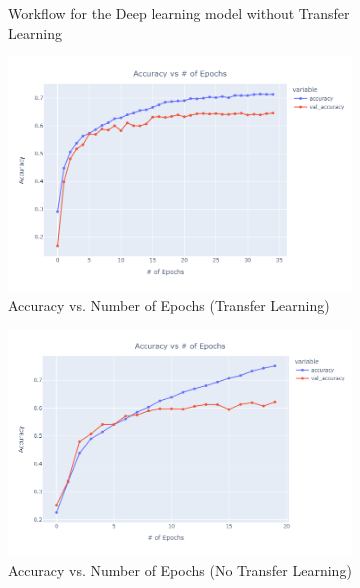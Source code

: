 \documentclass[conference]{IEEEtran}
\begin{document}
\begin{figure}[htbp]
\begin{subfigure}{0.22\textwidth}
        \caption{Workflow for the Deep learning model without Transfer Learning}
        \label{fig:workflow_DLnoTL}
    \end{subfigure}
    \begin{subfigure}{0.22\textwidth}
        \includegraphics[width=\textwidth]{Figures/accuracyvsnumepochs.png}
        \caption{Accuracy vs. Number of Epochs (Transfer Learning)}
        \label{fig:accuracy_tl}
    \end{subfigure}
    \begin{subfigure}{0.22\textwidth}
        \includegraphics[width=\textwidth]{Figures/acurracy vs numepochs - no TL.png}
        \caption{Accuracy vs. Number of Epochs (No Transfer Learning)}
        \label{fig:accuracy_no_tl}
    \end{subfigure}
    \begin{subfigure}{0.22\textwidth}

\end{subfigure}
\end{figure}
\end{document}
